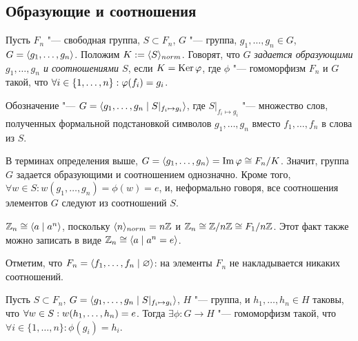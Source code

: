 \subsection{Образующие и соотношения}

\begin{definition}
	Пусть $F_n$ "--- свободная группа, $S \subset F_n$, $G$ "--- группа, $g_1, \dotsc, g_n \in G$, $G = \langle g_1, \dotsc, g_n\rangle$. Положим $K := \langle S\rangle_{norm}$. Говорят, что $G$ \textit{задается образующими $g_1, \dotsc, g_n$ и соотношениями $S$}, если $K = \operatorname{Ker}\varphi$, где $\phi$ "--- гомоморфизм $F_n$ и $G$ такой, что $\forall i \hm\in \{1, \dotsc, n\}: \phi(f_i) = g_i$.
	
	Обозначение "--- $G = \langle g_1, \dotsc, g_n\mid S|_{f_i \mapsto g_i}\rangle$, где $S|_{f_i \mapsto g_i}$ "--- множество слов, полученных формальной подстановкой символов $g_1, \dotsc, g_n$ вместо $f_1, \dotsc, f_n$ в слова из $S$.
\end{definition}

\begin{note}
	В терминах определения выше, $G = \gl g_1, \dotsc, g_n\gr \hm= \im\phi \cong F_n / K$. Значит, группа $G$ задается образующими и соотношением однозначно. Кроме того, $\forall w \in S: w(g_1, \dotsc, g_n) = \phi(w) = e$, и, неформально говоря, все соотношения элементов $G$ следуют из соотношений $S$.
\end{note}

\begin{example}
	$\mathbb{Z}_n \cong \langle a\mid a^n\rangle$, поскольку $\langle n\rangle_{norm} = n\mathbb{Z}$ и $\Z_n \hm\cong \Z/n\Z \hm\cong F_1/n\Z$. Этот факт также можно записать в виде $\mathbb{Z}_n \cong \langle a\mid a^n = e\rangle$.
\end{example}

\begin{note}
	Отметим, что $F_n = \langle f_1, \dotsc, f_n\mid \varnothing\rangle$: на элементы $F_n$ не накладывается никаких соотношений.
\end{note}

\begin{theorem}
	Пусть $S \subset F_n$, $G = \langle g_1, \dotsc, g_n\mid S|_{f_i \mapsto g_i}\rangle$, $H$ "--- группа, и $h_1, \dotsc, h_n \in H$ таковы, что $\forall w \in S: w(h_1, \dotsc, h_n) \hm= e$. Тогда $\exists \phi: G \to H$ "--- гомоморфизм такой, что $\forall i \in \{1, \dotsc, n\}: \phi(g_i) = h_i$.
\end{theorem}

